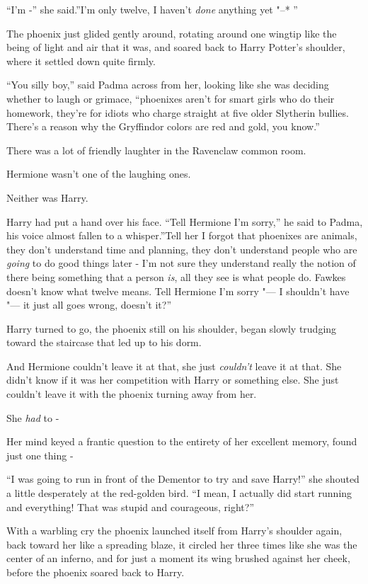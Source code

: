 ``I'm -'' she said.''I'm only twelve, I haven't \emph{done} anything yet
"--* ''

The phoenix just glided gently around, rotating around one wingtip like
the being of light and air that it was, and soared back to Harry
Potter's shoulder, where it settled down quite firmly.

``You silly boy,'' said Padma across from her, looking like she was
deciding whether to laugh or grimace, ``phoenixes aren't for smart girls
who do their homework, they're for idiots who charge straight at five
older Slytherin bullies. There's a reason why the Gryffindor colors are
red and gold, you know.''

There was a lot of friendly laughter in the Ravenclaw common room.

Hermione wasn't one of the laughing ones.

Neither was Harry.

Harry had put a hand over his face. ``Tell Hermione I'm sorry,'' he said
to Padma, his voice almost fallen to a whisper.''Tell her I forgot that
phoenixes are animals, they don't understand time and planning, they
don't understand people who are \emph{going} to do good things later -
I'm not sure they understand really the notion of there being something
that a person \emph{is}, all they see is what people do. Fawkes doesn't
know what twelve means. Tell Hermione I'm sorry "--- I shouldn't have "--- it
just all goes wrong, doesn't it?''

Harry turned to go, the phoenix still on his shoulder, began slowly
trudging toward the staircase that led up to his dorm.

And Hermione couldn't leave it at that, she just \emph{couldn't} leave
it at that. She didn't know if it was her competition with Harry or
something else. She just couldn't leave it with the phoenix turning away
from her.

She \emph{had} to -

Her mind keyed a frantic question to the entirety of her excellent
memory, found just one thing -

``I was going to run in front of the Dementor to try and save Harry!''
she shouted a little desperately at the red-golden bird. ``I mean, I
actually did start running and everything! That was stupid and
courageous, right?''

With a warbling cry the phoenix launched itself from Harry's shoulder
again, back toward her like a spreading blaze, it circled her three
times like she was the center of an inferno, and for just a moment its
wing brushed against her cheek, before the phoenix soared back to Harry.

